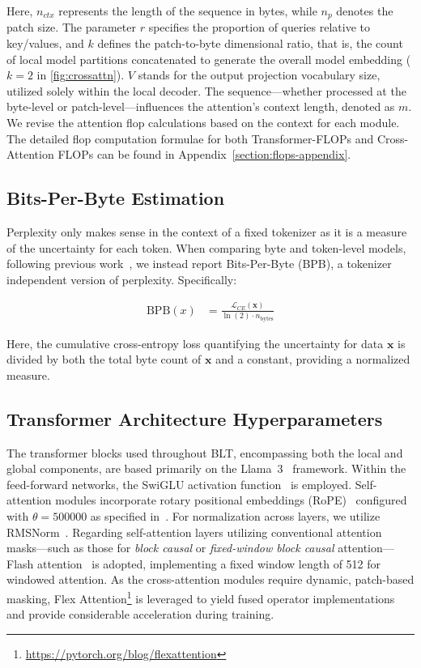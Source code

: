 Here, $n_{ctx}$ represents the length of the sequence in bytes, while $n_p$ denotes the patch size. The parameter $r$ specifies the proportion of queries relative to key/values, and $k$ defines the patch-to-byte dimensional ratio, that is, the count of local model partitions concatenated to generate the overall model embedding ($k=2$ in \autoref{fig:crossattn}). $V$ stands for the output projection vocabulary size, utilized solely within the local decoder. The sequence—whether processed at the byte-level or patch-level—influences the attention’s context length, denoted as $m$. We revise the attention flop calculations based on the context for each module. The detailed flop computation formulae for both Transformer-FLOPs and Cross-Attention FLOPs can be found in Appendix~\ref{section:flops-appendix}.

\subsection{Bits-Per-Byte Estimation} Perplexity only makes sense in the context of a fixed tokenizer as it is a measure of the uncertainty for each token. When comparing byte and token-level models, following previous work~\citep{xue2022byt5, yu2023megabyte, wang2024mambabyte}, we instead report Bits-Per-Byte (BPB), a tokenizer independent version of perplexity. Specifically:

\begin{align}
    \text{BPB}(x)&= \frac{\mathcal{L}_{CE}(\pmb{x})}{\ln(2)\cdot n_{\text{bytes}}}
\end{align}

Here, the cumulative cross-entropy loss quantifying the uncertainty for data $\pmb{x}$ is divided by both the total byte count of $\pmb{x}$ and a constant, providing a normalized measure.

\subsection{Transformer Architecture Hyperparameters} The transformer blocks used throughout {\textsc BLT}, encompassing both the local and global components, are based primarily on the Llama~3~\citep{dubey2024llama} framework. Within the feed-forward networks, the SwiGLU activation function~\citep{swiglu} is employed. Self-attention modules incorporate rotary positional embeddings (RoPE)~\citep{RoPe} configured with $\theta=500000$ as specified in~\citep{xiong2024effective}. For normalization across layers, we utilize RMSNorm~\citep{RMSNorm}. Regarding self-attention layers utilizing conventional attention masks—such as those for \textit{block causal} or \textit{fixed-window block causal} attention—Flash attention~\citep{dao2022flashattention} is adopted, implementing a fixed window length of 512 for windowed attention. As the cross-attention modules require dynamic, patch-based masking, Flex Attention\footnote{\url{https://pytorch.org/blog/flexattention}} is leveraged to yield fused operator implementations and provide considerable acceleration during training.

